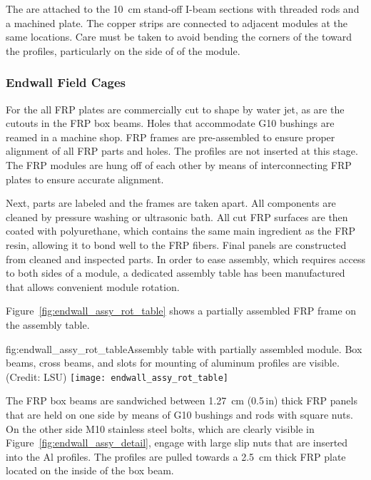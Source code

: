 The  are attached to the \SI{10}{\cm} stand-off I-beam sections with threaded rods and a machined plate. The copper strips are connected to adjacent modules at the same locations. Care must be taken to avoid bending the corners of the  toward the profiles, particularly on the  side of of the module.

\subsubsection{Endwall Field Cages}

For the  all FRP plates are commercially cut to shape by water jet, as are the cutouts in the FRP box beams. %
Holes that accommodate G10 bushings are reamed in a machine shop. FRP frames are pre-assembled to ensure proper alignment of all FRP parts and %
holes. The profiles are not inserted at this stage. The FRP modules are hung off of each other by means of interconnecting FRP plates to ensure accurate alignment.

Next, parts are labeled and the frames are taken apart. All components are cleaned by pressure washing or ultrasonic bath. All cut FRP surfaces are then coated with polyurethane, which contains the same main ingredient as the FRP resin, allowing it to bond well to the FRP fibers. Final panels are constructed from cleaned and inspected parts. In order to ease assembly, which requires access to both sides of a module,
a dedicated assembly table has been manufactured that allows convenient module rotation. 

Figure~\ref{fig:endwall_assy_rot_table} shows a partially assembled  FRP frame on the assembly table.
\begin{dunefigure}{fig:endwall_assy_rot_table}{Assembly table with partially assembled  module. Box beams, cross beams, and slots for mounting of aluminum profiles are visible. (Credit: LSU)}
 \texttt{[image: endwall\_assy\_rot\_table]}
 \end{dunefigure}
The FRP box beams are sandwiched between \SI{1.27}{\cm} (\num{0.5}\,in) thick FRP panels that are held on one side by means of G10 bushings and rods with square nuts.
On the other side M10 stainless steel bolts, which are clearly visible in Figure~\ref{fig:endwall_assy_detail},  
engage with large slip nuts that are inserted into the Al profiles. The profiles 
are pulled towards a \SI{2.5}{\cm} thick FRP plate located 
on the inside of the box beam.
%

